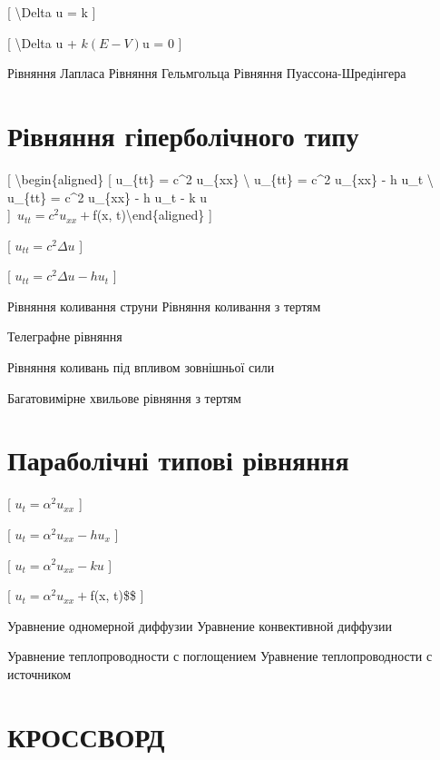 \documentclass[
]{article}
\begin{document}
{{{{{[} \textbackslash Delta u = k {]}

{[} \textbackslash Delta u + \(k(E - V)\)u = 0 {]}

Рівняння Лапласа Рівняння Гельмгольца Рівняння Пуассона-Шредінгера

\section{Рівняння гіперболічного
типу}\label{ux440ux456ux432ux43dux44fux43dux43dux44f-ux433ux456ux43fux435ux440ux431ux43eux43bux456ux447ux43dux43eux433ux43e-ux442ux438ux43fux443-1}

{[} \textbackslash begin\{aligned\} {[} u\_\{tt\} = c\^{}2 u\_\{xx\}
\textbackslash{} u\_\{tt\} = c\^{}2 u\_\{xx\} - h u\_t \textbackslash{}
u\_\{tt\} = c\^{}2 u\_\{xx\} - h u\_t - k u\\
{]}~\(u_{tt} = c^2 u_{xx} +\)f(x, t)\textbackslash end\{aligned\} {]}

{[} \(u_{tt} = c^2 \Delta u\) {]}

{[} \(u_{tt} = c^2 \Delta u - hu_t\) {]}

Рівняння коливання струни Рівняння коливання з тертям

Телеграфне рівняння

Рівняння коливань під впливом зовнішньої сили

Багатовимірне хвильове рівняння з тертям

\section{Параболічні типові
рівняння}\label{ux43fux430ux440ux430ux431ux43eux43bux456ux447ux43dux456-ux442ux438ux43fux43eux432ux456-ux440ux456ux432ux43dux44fux43dux43dux44f}

{[} \(u_t = \alpha^2 u_{xx}\) {]}

{[} \(u_t = \alpha^2 u_{xx} - hu_x\) {]}

{[} \(u_t = \alpha^2 u_{xx} - ku\) {]}

{[} \(u_t = \alpha^2 u_{xx} +\)f(x, t)\$\$ {]}

Уравнение одномерной диффузии Уравнение конвективной диффузии

Уравнение теплопроводности с поглощением Уравнение теплопроводности с
источником

\section{\texorpdfstring{\textbf{КРОССВОРД}}{КРОССВОРД}}\label{ux43aux440ux43eux441ux441ux432ux43eux440ux434-1}

}}}}
\end{document}
